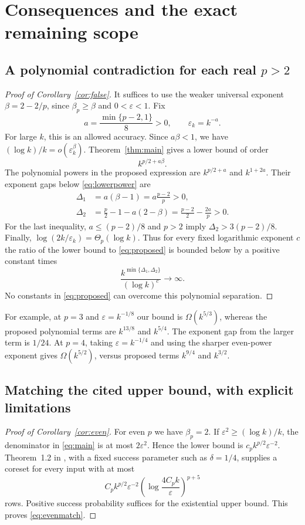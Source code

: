 \documentclass[11pt,letterpaper]{article}
\theoremstyle{definition}
\theoremstyle{remark}
\numberwithin{equation}{section}
\newcommand{\eps}{\varepsilon}
\begin{document}
\section{Consequences and the exact remaining scope}\label{sec:scope}
\subsection{A polynomial contradiction for each real \texorpdfstring{$p>2$}{p>2}}
\begin{proof}[Proof of Corollary~\ref{cor:false}]
It suffices to use the weaker universal exponent $\beta=2-2/p$, since $\beta_p\ge\beta$ and $0<\eps<1$. Fix
\begin{equation}\label{eq:achoice}
 a=\frac{\min\{p-2,1\}}8>0,\qquad \eps_k=k^{-a}.
\end{equation}
For large $k$, this is an allowed accuracy. Since $a\beta<1$, we have $(\log k)/k=o(\eps_k^\beta)$. Theorem~\ref{thm:main} gives a lower bound of order
\begin{equation}\label{eq:lowerpower}
 k^{p/2+a\beta}.
\end{equation}
The polynomial powers in the proposed expression are $k^{p/2+a}$ and $k^{1+2a}$. Their exponent gaps below \eqref{eq:lowerpower} are
\begin{align}
 \Delta_1&=a(\beta-1)=a\frac{p-2}{p}>0,\label{eq:gap1}\\
 \Delta_2&=\frac p2-1-a(2-\beta)=\frac{p-2}{2}-\frac{2a}{p}>0.\label{eq:gap2}
\end{align}
For the last inequality, $a\le(p-2)/8$ and $p>2$ imply $\Delta_2>3(p-2)/8$. Finally, $\log(2k/\eps_k)=\Theta_p(\log k)$. Thus for every fixed logarithmic exponent $c$ the ratio of the lower bound to \eqref{eq:proposed} is bounded below by a positive constant times
\[
 \frac{k^{\min\{\Delta_1,\Delta_2\}}}{(\log k)^c}\longrightarrow\infty.
\]
No constants in \eqref{eq:proposed} can overcome this polynomial separation.
\end{proof}

For example, at $p=3$ and $\eps=k^{-1/8}$ our bound is $\Omega(k^{5/3})$, whereas the proposed polynomial terms are $k^{13/8}$ and $k^{5/4}$. The exponent gap from the larger term is $1/24$. At $p=4$, taking $\eps=k^{-1/4}$ and using the sharper even-power exponent gives $\Omega(k^{5/2})$, versus proposed terms $k^{9/4}$ and $k^{3/2}$.

\subsection{Matching the cited upper bound, with explicit limitations}
\begin{proof}[Proof of Corollary~\ref{cor:even}]
For even $p$ we have $\beta_p=2$. If $\eps^2\ge(\log k)/k$, the denominator in \eqref{eq:main} is at most $2\eps^2$. Hence the lower bound is $c_pk^{p/2}\eps^{-2}$. Theorem~1.2 in \cite{LMW}, with a fixed success parameter such as $\delta=1/4$, supplies a coreset for every input with at most
\[
 C_pk^{p/2}\eps^{-2}\left(\log\frac{4C_pk}{\eps}\right)^{p+5}
\]
rows. Positive success probability suffices for the existential upper bound. This proves \eqref{eq:evenmatch}.
\end{proof}
\end{document}
